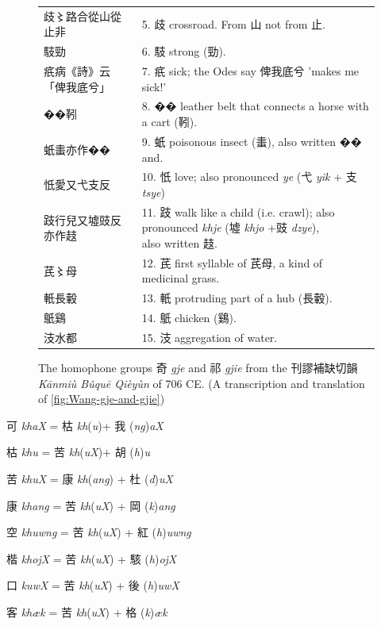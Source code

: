 \begin{figure}[p]
\begin{adjustbox}{max width=1.3\textwidth,center}
\begin{tabular}{ll}
{\large 歧}〻路合從山從止非
& 5. {\large 歧} crossroad. From 山 not from 止. \\
{\large 馶}勁
& 6. {\large 馶} strong (勁). \\
{\large 疧}病《詩》云「俾我底兮」 
& 7. {\large 疧} sick; the Odes say 俾我底兮 'makes me sick!' \\
{\large ��}靷
& 8. {\large ��} leather belt that connects a horse with a cart (靷). \\
{\large 蚔}䖯亦作��
& 9. {\large 蚔} poisonous insect (䖯), also written �� and. \\
{\large 忯}愛又弋支反
& 10. 忯 love; also pronounced \textit{ye}  (弋 \textit{yik} + 支 \textit{tsye}) \\
{\large 跂}行兒又墟豉反亦作䞚
& \makecell[l]{11. 跂 walk like a child (i.e. crawl); also pronounced \textit{khje} (墟 \textit{khjo} +豉 \textit{dzye}), \\ also written 䞚.} \\
{\large 芪}〻母
& 12. {\large 芪} first syllable of 芪母, a kind of medicinal grass. \\
{\large 軝}長轂
& 13. {\large 軝} protruding part of a hub (長轂). \\
{\large 䲬}鷄
& 14. {\large 䲬} chicken (鷄). \\
{\large 汥}水都
& 15. {\large 汥} aggregation of water.
        \end{tabular}
\end{adjustbox}
\caption{The homophone groups 奇 \textit{gje} and 祁 \textit{gjie} from the 刊謬補缺切韻 \textit{Kānmiù Bǔquē Qièyùn} of 706 CE. (A transcription and translation of \ref{fig:Wang-gje-and-gjie})}
\end{figure}


\begin{description} \item
可 \emph{khaX} = 枯 \emph{kh}(\emph{u})+ 我 (\emph{ng})\emph{aX}
\item
枯  \emph{khu} = 苦  \emph{kh}(\emph{uX})+ 胡 (\emph{h})\emph{u}
\item
苦  \emph{khuX} = 康  \emph{kh}(\emph{ang}) + 杜 (\emph{d})\emph{uX}
\item
康 \emph{khang} = 苦  \emph{kh}(\emph{uX}) + 岡 (\emph{k})\emph{ang}
\item
空 \emph{khuwng} = 苦  \emph{kh}(\emph{uX}) + 紅 (\emph{h})\emph{uwng}
\item
楷  \emph{khojX} = 苦  \emph{kh}(\emph{uX}) + 駭 (\emph{h})\emph{ojX}
\item
口 \emph{kuwX} = 苦  \emph{kh}(\emph{uX}) + 後 (\emph{h})\emph{uwX}
\item
客 \emph{khæk} = 苦 \emph{kh}(\emph{uX}) + 格 (\emph{k})\emph{æk}
\end{description}


